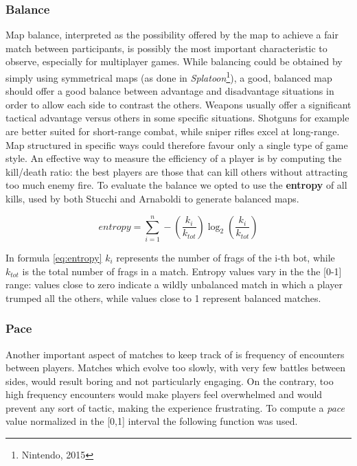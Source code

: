 \subsubsection{Balance}
Map balance, interpreted as the possibility offered by the map to achieve a fair match between participants, is possibly the most important characteristic to observe, especially for multiplayer games. While balancing could be obtained by simply using symmetrical maps (as done in \textit{Splatoon}\footnote{Nintendo, 2015}), a good, balanced map should offer a good balance between advantage and disadvantage situations in order to allow each side to contrast the others.
Weapons usually offer a significant tactical advantage versus others in some specific situations. Shotguns for example are better suited for short-range combat, while sniper rifles excel at long-range. Map structured in specific ways could therefore favour only a single type of game style. 
An effective way to measure the efficiency of a player is by computing the kill/death ratio: the best players are those that can kill others without attracting too much enemy fire.
To evaluate the balance we opted to use the \textbf{entropy} of all kills, used by both Stucchi \cite{stucchi_evoluzione} and Arnaboldi \cite{arnaboldi_framework} to generate balanced maps.

\begin{equation}
entropy = \sum_{i=1}^{n} - \left( \frac{k_i}{k_{tot}} \right) \log_2 \left( \frac{k_i}{k_{tot}} \right)  
\label{eq:entropy}
\end{equation}

In formula \eqref{eq:entropy} $k_i$ represents the number of frags of the i-th bot, while $k_{tot}$ is the total number of frags in a match.
Entropy values vary in the the [0-1] range: values close to zero indicate a wildly unbalanced match in which a player trumped all the others, while values close to 1 represent balanced matches.

\subsubsection{Pace}
Another important aspect of matches to keep track of is frequency of encounters between players. Matches which evolve too slowly, with very few battles between sides, would result boring and not particularly engaging. On the contrary, too high frequency encounters would make players feel overwhelmed and would prevent any sort of tactic, making the experience frustrating.
To compute a \textit{pace} value normalized in the [0,1] interval the following function  was used.

